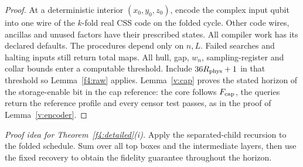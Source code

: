 \begin{proof}
At a deterministic interior \((x_0,y_0,z_0)\), encode the complex input
qubit into one wire of the \(k\)-fold real CSS code on the folded
cycle. Other code wires, ancillas and unused factors have their
prescribed states. All compiler work has its declared defaults.
The procedures depend only on \(n,L\). Failed searches and halting
inputs still return total maps. All hull, gap, \(w_n\), sampling-register and
collar bounds enter a computable threshold. Include
\(36R_{\rm phys}+1\) in that threshold so Lemma~\ref{f4:raw} applies. Lemma~\ref{v:cap} proves
the stated horizon of the storage-enable bit in the cap reference:
the core follows \(F_{\rm cap}\), the queries return the reference
profile and every censor test passes, as in the proof of Lemma~\ref{v:encoder}.
\end{proof}

\noindent\emph{Proof idea for Theorem~\ref{f4:detailed}(i).}
Apply the separated-child recursion to the folded schedule. Sum over all top boxes and the intermediate layers, then use the fixed recovery to obtain the fidelity guarantee throughout the horizon.

